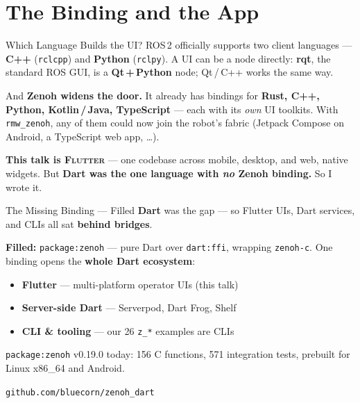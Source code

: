 \documentclass[9pt]{beamer}
\begin{document}
\section{The Binding and the App}

\begin{frame}{Which Language Builds the UI?}
  ROS\,2 officially supports two client languages --- \textbf{C++} (\texttt{rclcpp}) and \textbf{Python} (\texttt{rclpy}). A UI can be a node directly: \textbf{rqt}, the standard ROS GUI, is a \textbf{Qt\,+\,Python} node; Qt\,/\,C++ works the same way.

  \vspace{0.4em}
  And \textbf{Zenoh widens the door.} It already has bindings for \textbf{Rust, C++, Python, Kotlin\,/\,Java, TypeScript} --- each with its \emph{own} UI toolkits. With \texttt{rmw\_zenoh}, any of them could now join the robot's fabric (Jetpack Compose on Android, a TypeScript web app, \ldots).

  \vspace{0.5em}
  \textbf{This talk is \textsc{Flutter}} --- one codebase across mobile, desktop, and web, native widgets. But \textbf{Dart was the one language with \emph{no} Zenoh binding.} So I wrote it.
\end{frame}

\begin{frame}{The Missing Binding --- Filled}
  \textbf{Dart} was the gap --- so Flutter UIs, Dart services, and CLIs all sat \textbf{behind bridges}.

  \vspace{0.5em}
  \textbf{Filled:} \texttt{package:zenoh} --- pure Dart over \texttt{dart:ffi}, wrapping \texttt{zenoh-c}. One binding opens the \textbf{whole Dart ecosystem}:
  \begin{itemize}
    \item \textbf{Flutter} --- multi-platform operator UIs (this talk)
    \item \textbf{Server-side Dart} --- Serverpod, Dart Frog, Shelf
    \item \textbf{CLI \& tooling} --- our 26 \texttt{z\_*} examples are CLIs
  \end{itemize}

  \vspace{0.3em}
  {\small \texttt{package:zenoh} v0.19.0 today: 156 C functions, 571 integration tests, prebuilt for Linux x86\_64 and Android.}

  \vspace{0.3em}
  {\small\textcolor{m3LightPrimary}{\texttt{github.com/bluecorn/zenoh\_dart}}}
\end{frame}
\end{document}
